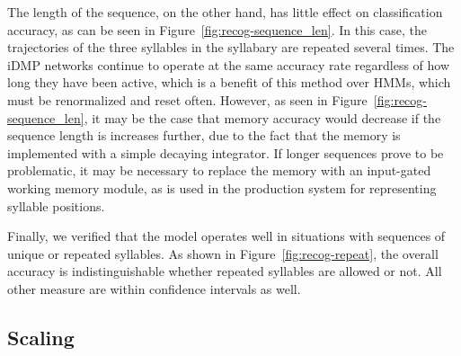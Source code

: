 
The length of the sequence,
on the other hand,
has little effect on classification accuracy,
as can be seen in Figure~\ref{fig:recog-sequence_len}.
In this case, the trajectories
of the three syllables in the syllabary
are repeated several times.
The iDMP networks continue to operate
at the same accuracy rate
regardless of how long they have been active,
which is a benefit of this method
over HMMs, which must be renormalized
and reset often.
However, as seen in Figure~\ref{fig:recog-sequence_len},
it may be the case that memory accuracy
would decrease if the sequence length
is increases further,
due to the fact that the memory
is implemented with a simple decaying integrator.
If longer sequences prove to be problematic,
it may be necessary to replace the memory
with an input-gated working memory module,
as is used in the production system
for representing syllable positions.


Finally, we verified that the model
operates well in situations with
sequences of unique or repeated syllables.
As shown in Figure~\ref{fig:recog-repeat},
the overall accuracy is indistinguishable
whether repeated syllables are allowed or not.
All other measure are within confidence intervals as well.

\subsection{Scaling}
\label{sec:res-recog-scaling}

